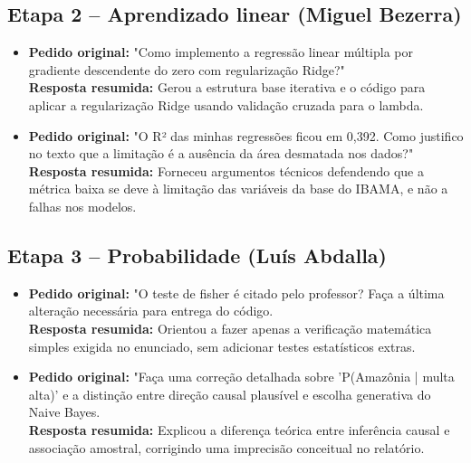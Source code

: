 \documentclass[11pt]{article}
\begin{document}
\subsection*{Etapa 2 -- Aprendizado linear (Miguel Bezerra)}
\begin{itemize}
    \item \textbf{Pedido original:} "Como implemento a regressão linear múltipla por gradiente descendente do zero com regularização Ridge?" \\
    \textbf{Resposta resumida:} Gerou a estrutura base iterativa e o código para aplicar a regularização Ridge usando validação cruzada para o lambda.
    
    \item \textbf{Pedido original:} "O R² das minhas regressões ficou em 0,392. Como justifico no texto que a limitação é a ausência da área desmatada nos dados?" \\
    \textbf{Resposta resumida:} Forneceu argumentos técnicos defendendo que a métrica baixa se deve à limitação das variáveis da base do IBAMA, e não a falhas nos modelos.
\end{itemize}

\subsection*{Etapa 3 -- Probabilidade (Luís Abdalla)}
\begin{itemize}
    \item \textbf{Pedido original:} "O teste de fisher é citado pelo professor? Faça a última alteração necessária para entrega do código. \\
    \textbf{Resposta resumida:} Orientou a fazer apenas a verificação matemática simples exigida no enunciado, sem adicionar testes estatísticos extras.
    
    \item \textbf{Pedido original:} "Faça uma correção detalhada sobre 'P(Amazônia | multa alta)' e a distinção entre direção causal plausível e escolha generativa do Naive Bayes. \\
    \textbf{Resposta resumida:} Explicou a diferença teórica entre inferência causal e associação amostral, corrigindo uma imprecisão conceitual no relatório.
\end{itemize}
\end{document}
